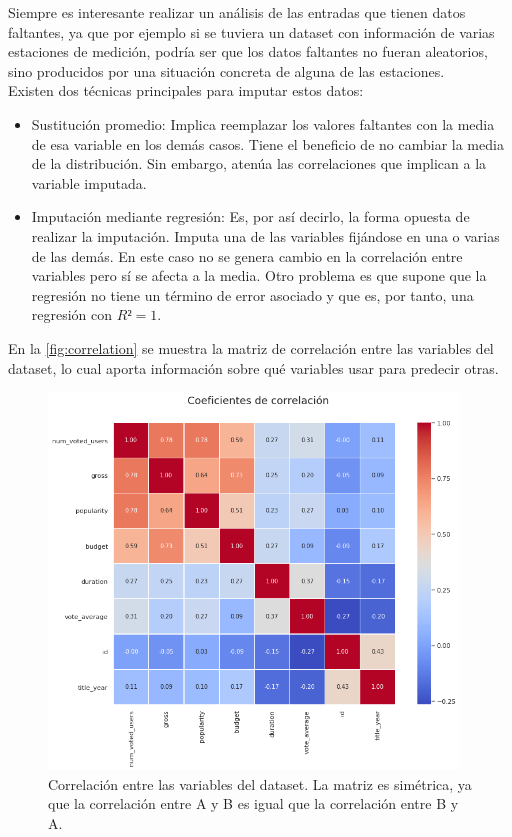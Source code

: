 Siempre es interesante realizar un análisis de las entradas que tienen datos faltantes, ya que por ejemplo si se tuviera un dataset con información de varias estaciones de medición, podría ser que los datos faltantes no fueran aleatorios, sino producidos por una situación concreta de alguna de las estaciones.\\

Existen dos técnicas principales para imputar estos datos:

\begin{itemize}
    \item Sustitución promedio: Implica reemplazar los valores faltantes con la media de esa variable en los demás casos. Tiene el beneficio de no cambiar la media de la distribución. Sin embargo, atenúa las correlaciones que implican a la variable imputada.
    \item Imputación mediante regresión: Es, por así decirlo, la forma opuesta de realizar la imputación. Imputa una de las variables fijándose en una o varias de las demás. En este caso no se genera cambio en la correlación entre variables pero sí se afecta a la media. Otro problema es que supone que la regresión no tiene un término de error asociado y que es, por tanto, una regresión con $R² = 1$.
\end{itemize}

En la \autoref{fig:correlation} se muestra la matriz de correlación entre las variables del dataset, lo cual aporta información sobre qué variables usar para predecir otras.

\begin{figure}[H]
    \centering
    \captionsetup{width=12cm}
    \includegraphics[height=10cm]{./contenido/imagenes/correlation.png}
\caption{Correlación entre las variables del dataset. La matriz es simétrica, ya que la correlación entre A y B es igual que la correlación entre B y A.}
\label{fig:correlation}
\end{figure}

